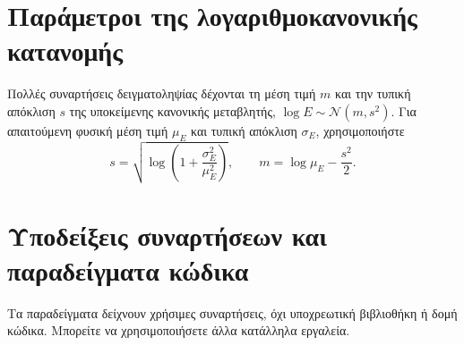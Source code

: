 \documentclass[11pt]{article}
\begin{document}
\vspace{3\baselineskip}
\appendix
\section{Παράμετροι της λογαριθμοκανονικής κατανομής}\label{sec:lognormal}
Πολλές συναρτήσεις δειγματοληψίας δέχονται τη μέση τιμή $m$ και την τυπική απόκλιση $s$ της υποκείμενης κανονικής μεταβλητής, $\log E\sim\mathcal N(m,s^2)$. Για απαιτούμενη φυσική μέση τιμή $\mu_E$ και τυπική απόκλιση $\sigma_E$, χρησιμοποιήστε
\[
s=\sqrt{\log\!\left(1+\frac{\sigma_E^2}{\mu_E^2}\right)},\qquad
m=\log\mu_E-\frac{s^2}{2}.
\]

\section{Υποδείξεις συναρτήσεων και παραδείγματα κώδικα}\label{sec:functions}
Τα παραδείγματα δείχνουν χρήσιμες συναρτήσεις, όχι υποχρεωτική βιβλιοθήκη ή δομή κώδικα. Μπορείτε να χρησιμοποιήσετε άλλα κατάλληλα εργαλεία.
\end{document}
